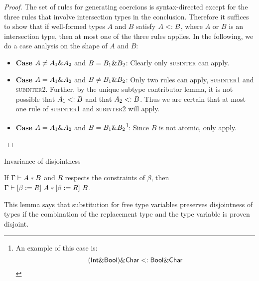 \begin{proof}
The set of rules for generating coercions is syntax-directed except for the three rules that involve intersection types in the conclusion. Therefore it suffices to show that if well-formed types $A$ and $B$ satisfy $A <: B$, where $A$ or $B$ is an intersection type, then at most one of the three rules applies. In the following, we do a case analysis on the shape of $A$ and $B$:

\begin{itemize}
  \item \textbf{Case} $A \neq A_1 \& A_2$ and $B = B_1 \& B_2$: Clearly only \textsc{subinter} can apply.
  \item \textbf{Case} $A = A_1 \& A_2$ and $B \neq B_1 \& B_2$: Only two rules can apply, \textsc{subinter1} and \textsc{subinter2}. Further, by the unique subtype contributor lemma, it is not possible that $A_1 <: B$ and that $A_2 <: B$. Thus we are certain that at most one rule of \textsc{subinter1} and \textsc{subinter2} will apply.
  \item \textbf{Case} $A = A_1 \& A_2$ and $B = B_1 \& B_2$\footnote{An example of this case is:
    \[ (\textsf{Int} \& \textsf{Bool}) \& \textsf{Char} <: \textsf{Bool} \& \textsf{Char} \]}: Since $B$ is not atomic, only  apply.

\end{itemize}
\end{proof}

\begin{lemma}{Invariance of disjointness}
  \label{invariance-of-disjointness}

  If $\Gamma \vdash A * B$ and $R$ respects the constraints of $\beta$, then
  $\Gamma \vdash \lbrack \beta := R \rbrack~ A * \lbrack \beta := R \rbrack~ B$.

\end{lemma}

This lemma says that substitution for free type variables preserves disjointness
of types if the combination of the replacement type and the type variable is
proven disjoint.

